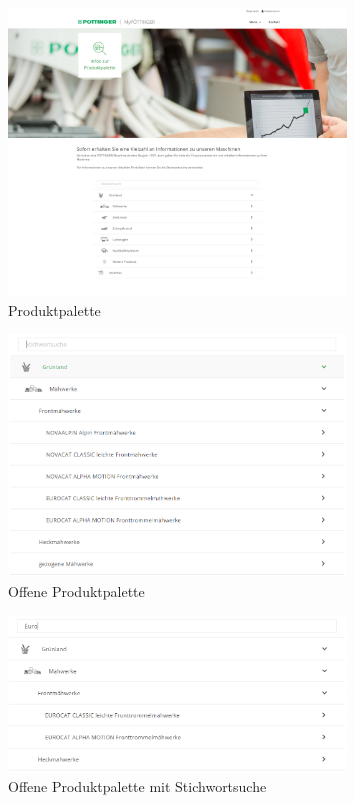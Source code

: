 \begin{figure}[H]
	\centerline{
		\includegraphics[width=0.8\textwidth]{./grafiken/erm_produktpalette.png}
	}
	\vskip0pt
	\caption{Produktpalette} \label{fig:produktpalette}
\end{figure}

\begin{figure}[H]
	\centerline{
		\includegraphics[width=0.8\textwidth]{./grafiken/erm_produktpalette_offen.png}
	}
	\vskip0pt
	\caption{Offene Produktpalette} \label{fig:produktpaletteOffen}
\end{figure}

\begin{figure}[H]
	\centerline{
		\includegraphics[width=0.8\textwidth]{./grafiken/erm_produktpalette_offen_stichwort.PNG}
	}
	\vskip0pt
	\caption{Offene Produktpalette mit Stichwortsuche} \label{fig:produktpaletteMitStichwort}
\end{figure}

